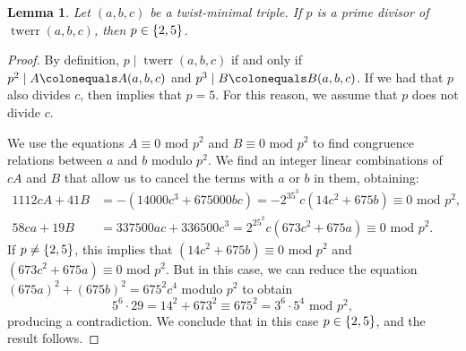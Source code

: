 \documentclass[12pt]{amsart}
\newcounter{counter}[section] %
\numberwithin{equation}{section} %
\newtheorem{lemma}[counter]{Lemma}
\theoremstyle{definition} \newtheorem{definition}[counter]{Definition}
\theoremstyle{remark} \newtheorem{nonexam}[counter]{Non-example}
\newcommand{\md}{\text{ mod }} %
\newcommand{\brk}[1]{\left\lbrace #1 \right\rbrace} %
\let\originalleft\left \let\originalright\right
\renewcommand{\left}{\mathopen{}\mathclose\bgroup\originalleft}
\renewcommand{\right}{\aftergroup\egroup\originalright}
\DeclareMathOperator{\twerr}{twerr} %
\begin{document}
\begin{lemma}
  Let $(a,b,c)$ be a twist-minimal triple. If $p$ is a prime divisor of
  $\twerr(a,b,c)$, then $p \in \brk{2,5}$.
\end{lemma}
\begin{proof}
  By definition, $p \mid \twerr(a,b,c)$ if and only if
  $p^2 \mid A \colonequals A(a,b,c)$ and $p^3 \mid B \colonequals B(a,b,c)$. If we had that $p$ also
  divides $c$, then  implies that
  $p = 5$. For this reason, we assume that $p$ does not divide $c$.

  We use the equations $A \equiv 0 \md p^2$ and $B \equiv 0 \md p^2$ to find
  congruence relations between $a$ and $b$ modulo $p^2$. We find an integer
  linear combinations of $cA$ and $B$ that allow us to cancel the terms with
  $a$ or $b$ in them, obtaining:
  \begin{align*}
    1112cA + 41B &= -(14000c^3 + 675000bc) = -2^35^3c(14c^2 + 675b) \equiv 0 \md
    p^2, \\
    58ca + 19B &= 337500ac + 336500c^3 = 2^25^3c(673c^2+675a) \equiv 0 \md p^2.
  \end{align*}
  If $p \neq \brk{2,5}$, this implies that $(14c^2 + 675b) \equiv 0 \md
    p^2$ and $(673c^2+675a) \equiv 0 \md p^2$. But in this case, we can reduce
    the equation $(675a)^2 + (675b)^2 = 675^2c^4$ modulo $p^2$ to obtain
    \begin{equation*}
      5^6\cdot 29 = 14^2 + 673^2 \equiv 675^2 = 3^6\cdot 5^4  \md p^2,
    \end{equation*}
    producing a contradiction. We conclude that in this case $p \in \brk{2,5}$,
    and the result follows.
\end{proof}
\end{document}
